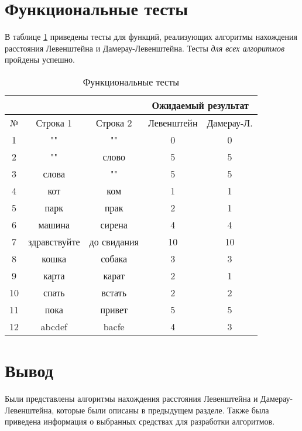 \section{Функциональные тесты}

В таблице \ref{tbl:functional_test} приведены тесты для функций, реализующих алгоритмы нахождения расстояния Левенштейна и Дамерау-Левенштейна. Тесты \textit{для всех алгоритмов} пройдены успешно.

\begin{table}[h]
	\begin{center}
        \begin{threeparttable}
        \captionsetup{justification=raggedright,singlelinecheck=off}
		\caption{\label{tbl:functional_test} Функциональные тесты}
		\begin{tabular}{|c|c|c|c|c|}
			\hline
			& & & \multicolumn{2}{c|}{Ожидаемый результат} \\
			\hline
			№&Строка 1&Строка 2&Левенштейн&Дамерау-Л. \\
			\hline
            1&""&""&0&0 \\
            \hline
            2&""&слово&5&5 \\
            \hline
            3&слова&""&5&5 \\
            \hline
            4&кот&ком&1&1 \\
			\hline
			5&парк&прак&2&1 \\
			\hline
            6&машина&сирена&4&4 \\
			\hline
			7&здравствуйте&до свидания&10&10 \\
			\hline
            8&кошка&собака&3&3 \\
			\hline
            9&карта&карат&2&1 \\
			\hline
            10&спать&встать&2&2 \\
			\hline
			11&пока&привет&5&5 \\
			\hline
            12&abcdef&bacfe&4&3 \\
			\hline
		\end{tabular}
        \end{threeparttable}
	\end{center}
\end{table}

\section{Вывод}

Были представлены алгоритмы нахождения расстояния Левенштейна и Дамерау-Левенштейна, которые были описаны в предыдущем разделе. Также была приведена информация о выбранных средствах для разработки алгоритмов.

